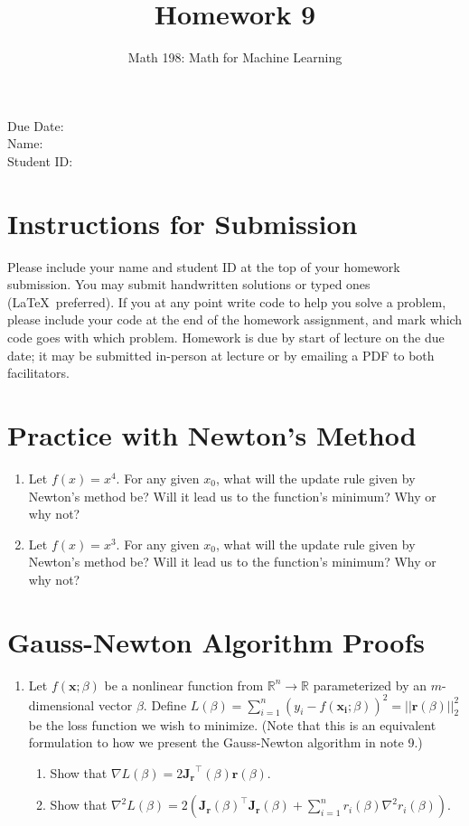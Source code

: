 \documentclass{article}
\title{Homework 9}
\author{Math 198: Math for Machine Learning}
\date{}
\begin{document}
\maketitle

\noindent
Due Date:  \\
Name: \\
Student ID:

\section*{Instructions for Submission}
Please include your name and student ID at the top of your homework submission. You may submit handwritten solutions or typed ones (\LaTeX\ preferred). If you at any point write code to help you solve a problem, please include your code at the end of the homework assignment, and mark which code goes with which problem. Homework is due by start of lecture on the due date; it may be submitted in-person at lecture or by emailing a PDF to both facilitators.

\section{Practice with Newton's Method}
\begin{enumerate}[label=\arabic*.]
\item Let $f(x) = x^4$. For any given $x_0$, what will the update rule given by Newton's method be? Will it lead us to the function's minimum? Why or why not?
\item Let $f(x) = x^3$. For any given $x_0$, what will the update rule given by Newton's method be? Will it lead us to the function's minimum? Why or why not?
\end{enumerate}

\section{Gauss-Newton Algorithm Proofs}
\begin{enumerate}[label=\arabic*.]
\item Let $f(\mathbf{x}; \beta)$ be a nonlinear function from $\mathbb{R}^n \rightarrow \mathbb{R}$ parameterized by an $m$-dimensional vector $\beta$. Define $L(\beta) = \sum_{i=1}^n (y_i - f(\mathbf{x_i}; \beta))^2 = ||\mathbf{r}(\beta)||_2^2$ be the loss function we wish to minimize. (Note that this is an equivalent formulation to how we present the Gauss-Newton algorithm in note 9.)
\begin{enumerate}[label=(\alph*)]
\item Show that $\nabla L(\beta) = 2\mathbf{J_r}^\top(\beta)\mathbf{r}(\beta)$.
\item Show that $\nabla^2 L(\beta) = 2(\mathbf{J_r}(\beta)^\top\mathbf{J_r}(\beta) + \sum_{i=1}^n r_i(\beta) \nabla^2 r_i(\beta))$.
\end{enumerate}
\end{enumerate}
\end{document}
